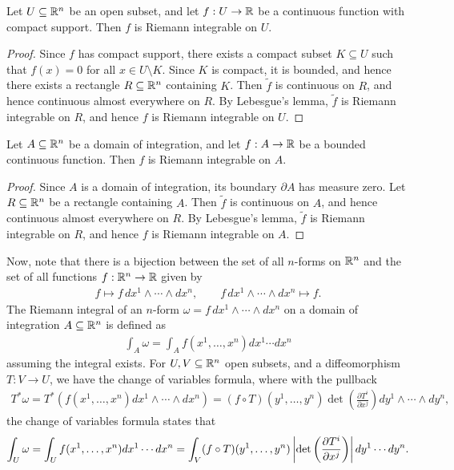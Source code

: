\begin{corollary}
    Let $U \subseteq \mathbb{R}^{n}$ be an open subset, and let $f:U \to \mathbb{R}$ be a continuous function with compact support. Then $f$ is Riemann integrable on $U$.
\end{corollary}
\begin{proof}
    Since $f$ has compact support, there exists a compact subset $K \subseteq U$ such that $f(x) = 0$ for all $x \in U \setminus K$. Since $K$ is compact, it is bounded, and hence there exists a rectangle $R \subseteq \mathbb{R}^{n}$ containing $K$. Then $\tilde{f}$ is continuous on $R$, and hence continuous almost everywhere on $R$. By Lebesgue's lemma, $\tilde{f}$ is Riemann integrable on $R$, and hence $f$ is Riemann integrable on $U$.
\end{proof}

\begin{corollary}
    Let $A \subseteq \mathbb{R}^{n}$ be a domain of integration, and let $f:A \to \mathbb{R}$ be a bounded continuous function. Then $f$ is Riemann integrable on $A$.
\end{corollary}

\begin{proof}
    Since $A$ is a domain of integration, its boundary $\partial A$ has measure zero. Let $R \subseteq \mathbb{R}^{n}$ be a rectangle containing $A$. Then $\tilde{f}$ is continuous on $A$, and hence continuous almost everywhere on $R$. By Lebesgue's lemma, $\tilde{f}$ is Riemann integrable on $R$, and hence $f$ is Riemann integrable on $A$.
\end{proof}

Now, note that there is a bijection between the set of all $n$-forms on $\mathbb{R}^{n}$ and the set of all functions $f:\mathbb{R}^{n} \to \mathbb{R}$ given by
\begin{align}
    f \mapsto f\,dx^{1} \wedge \cdots \wedge dx^{n}, \qquad f\,dx^{1} \wedge \cdots \wedge dx^{n} \mapsto f.
\end{align}
The Riemann integral of an $n$-form $\omega = f\,dx^{1} \wedge \cdots \wedge dx^{n}$ on a domain of integration $A \subseteq \mathbb{R}^{n}$ is defined as
\begin{align}
    \int_{A} \omega = \int_{A} f(x^{1},\ldots,x^{n}) dx^{1} \cdots dx^{n}
\end{align}
assuming the integral exists. For $U,V \subseteq \mathbb{R}^{n}$ open subsets, and a diffeomorphism $T:V \to U$, we have the change of variables formula, where with the pullback
\begin{align}
    T^{\ast}\omega = T^{\ast}(f(x^{1},\ldots,x^{n}) dx^{1} \wedge \cdots \wedge dx^{n}) = (f \circ T)(y^{1},\ldots,y^{n}) \det\left( \frac{\partial T^{i}}{\partial x^{j}} \right) dy^{1} \wedge \cdots \wedge dy^{n},
\end{align}
the change of variables formula states that
\begin{align}
    \int_{U} \omega = \int_{U} f(x^{1},\ldots,x^{n}) dx^{1} \cdots dx^{n} = \int_{V} (f \circ T)(y^{1},\ldots,y^{n}) \left| \det\left( \frac{\partial T^{i}}{\partial x^{j}} \right) \right| dy^{1} \cdots dy^{n}.
\end{align}

